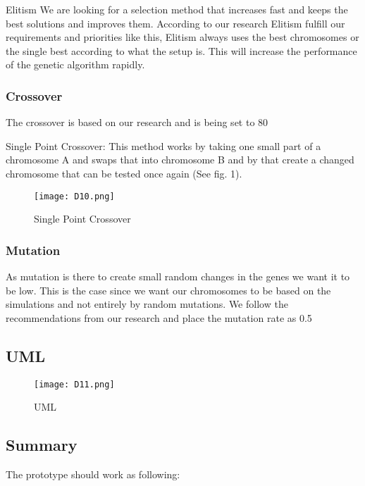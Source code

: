 Elitism
We are looking for a selection method that increases fast and keeps the best solutions and improves them. According to our research Elitism fulfill our requirements and priorities like this, Elitism always uses the best chromosomes or the single best according to what the setup is. This will increase the performance of the genetic algorithm rapidly.

\subsubsection{Crossover}
The crossover is based on our research and is being set to 80%

Single Point Crossover:
This method works by taking one small part of a chromosome A and swaps that into chromosome B and by that create a changed chromosome that can be tested once again (See fig. 1).


\begin{figure}[!htbp]
\centering
\texttt{[image: D10.png]}
\caption{ Single Point Crossover }
\label{fig:Crossover}
\end{figure}


\subsubsection{Mutation}
As mutation is there to create small random changes in the genes we want it to be low. This is the case since we want our chromosomes to be based on the simulations and not entirely by random mutations. We follow the recommendations from our research and place the mutation rate as 0.5%

\subsection{UML}

\begin{figure}[!htbp]
\centering
\texttt{[image: D11.png]}
\caption{ UML }
\label{fig:UML}
\end{figure}

\subsection{Summary}

The prototype should work as following:

